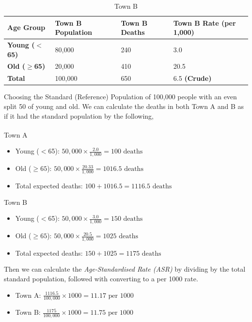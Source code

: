 \documentclass{article}
\begin{document}
\begin{table}[H]
\centering
\begin{tabular}{|l|l|l|l|}
\hline
\textbf{Age Group}   & \textbf{Town B Population} & \textbf{Town B Deaths} & \textbf{Town B Rate (per 1,000)} \\ \hline
\textbf{Young ($<$65)} & 80,000            & 240            & 3.0                     \\ \hline
\textbf{Old ($\geq$65)}  & 20,000            & 410          & 20.5                   \\ \hline
\textbf{Total}       & 100,000           & 650          & 6.5 \textbf{(Crude)}            \\ \hline
\end{tabular}
\caption{Town B}
\label{tab:town-b}
\end{table}

Choosing the Standard (Reference) Population of 100,000 people with an even split 50 of young and old.
We can calculate the deaths in both Town A and B as if it had the standard population by the following,
\\~\\
Town A
\begin{itemize}
    \item Young ($<$65): $50,000 \times \frac{2.0}{1,000} = 100 \text{ deaths}$
    \item Old ($\geq65$): $50,000 \times \frac{20.33}{1,000} = 1016.5 \text{ deaths}$
    \item Total expected deaths: $100 + 1016.5 = 1116.5 \text{ deaths}$
\end{itemize}

Town B
\begin{itemize}
    \item Young ($<$65): $50,000 \times \frac{3.0}{1,000} = 150 \text{ deaths}$
    \item Old ($\geq65$): $50,000 \times \frac{20.5}{1,000} = 1025 \text{ deaths}$
    \item Total expected deaths: $150 + 1025 = 1175 \text{ deaths}$
\end{itemize}

Then we can calculate the \textit{Age-Standardised Rate (ASR)} by dividing by the total standard population,
followed with converting to a per 1000 rate.
\begin{itemize}
    \item Town A: $\frac{1116.5}{100,000} \times 1000 = 11.17 \text{ per 1000}$
    \item Town B: $\frac{1175}{100,000} \times 1000 = 11.75 \text{ per 1000}$
\end{itemize}
\end{document}

